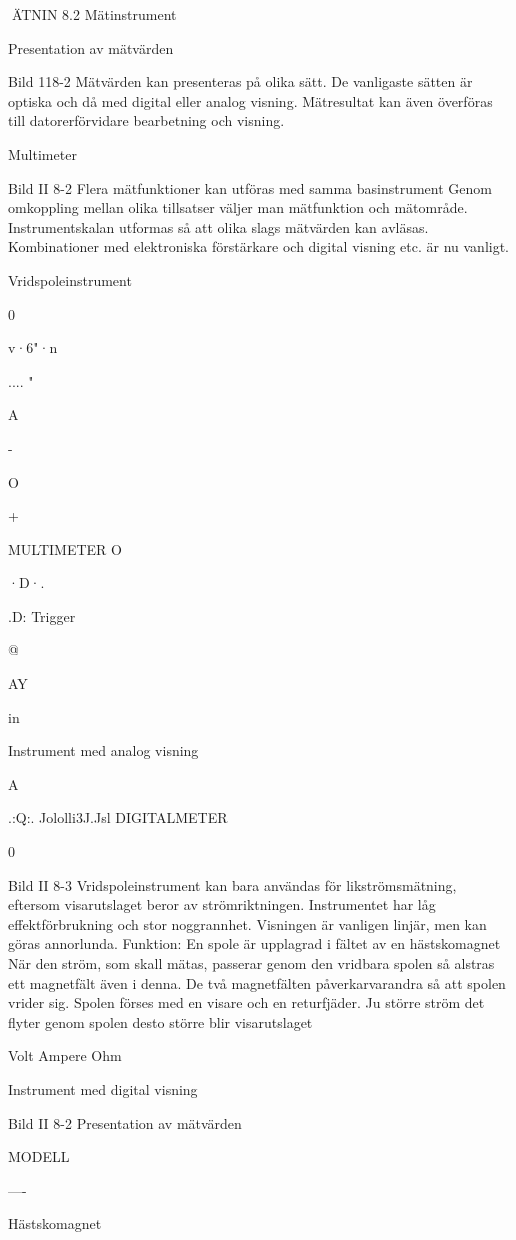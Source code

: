 \documentclass[a4paper,twoside,twocolumn,openright]{book}
\begin{document}
{{{{{ÄTNIN
8.2 Mätinstrument

Presentation av mätvärden

Bild 118-2
Mätvärden kan presenteras på olika sätt. De
vanligaste sätten är optiska och då med
digital eller analog visning. Mätresultat kan
även överföras till datorerförvidare bearbetning och visning.

Multimeter

Bild II 8-2
Flera mätfunktioner kan utföras med samma
basinstrument Genom omkoppling mellan
olika tillsatser väljer man mätfunktion och
mätområde. Instrumentskalan utformas så
att olika slags mätvärden kan avläsas.
Kombinationer med elektroniska förstärkare
och digital visning etc. är nu vanligt.

Vridspoleinstrument

0

v·6"·n

.... "

A

-

O

+

MULTIMETER O

·D·.

.D:
Trigger

@

AY

in

Instrument med analog visning

A

.:Q:. Jololli3J.Jsl
DIGITALMETER

0

Bild II 8-3
Vridspoleinstrument kan bara användas för
likströmsmätning, eftersom visarutslaget
beror av strömriktningen. Instrumentet har
låg effektförbrukning och stor noggrannhet.
Visningen är vanligen linjär, men kan göras
annorlunda.
Funktion: En spole är upplagrad i fältet av
en hästskomagnet När den ström, som skall
mätas, passerar genom den vridbara spolen
så alstras ett magnetfält även i denna. De två
magnetfälten påverkarvarandra så att spolen
vrider sig. Spolen förses med en visare och
en returfjäder. Ju större ström det flyter genom spolen desto större blir visarutslaget

Volt
Ampere
Ohm

Instrument med digital visning

Bild II 8-2 Presentation av mätvärden

MODELL

----

Hästskomagnet

}}}}}
\end{document}
